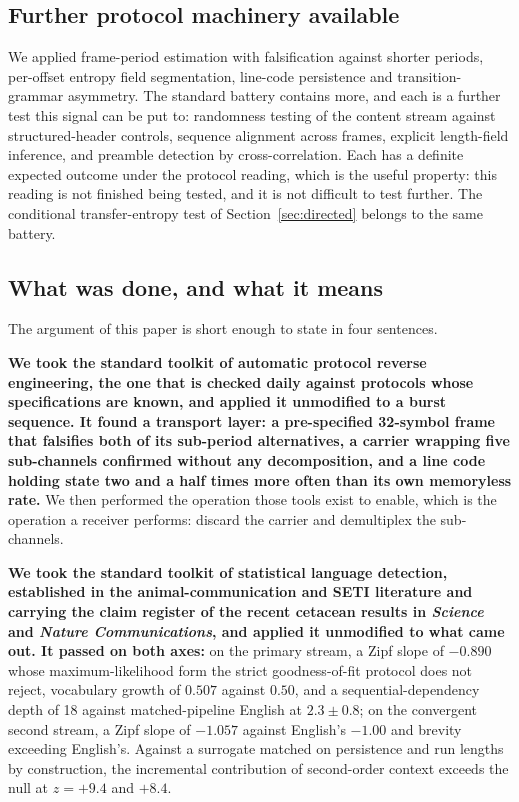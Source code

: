 \documentclass[11pt,a4paper]{article}
\begin{document}
\subsection{Further protocol machinery available}
\label{sec:further}

We applied frame-period estimation with falsification against shorter periods,
per-offset entropy field segmentation, line-code persistence and
transition-grammar asymmetry. The standard battery contains more, and each is a further
test this signal can be put to: randomness testing of the content stream against
structured-header controls, sequence alignment across frames, explicit length-field
inference, and preamble detection by cross-correlation. Each has a definite expected
outcome under the protocol reading, which is the useful property: this reading is not
finished being tested, and it is not difficult to test further. The conditional
transfer-entropy test of Section~\ref{sec:directed} belongs to the same battery.

\subsection{What was done, and what it means}

The argument of this paper is short enough to state in four sentences.

\textbf{We took the standard toolkit of automatic protocol reverse engineering, the one
that is checked daily against protocols whose specifications are known, and applied it
unmodified to a burst sequence. It found a transport layer: a pre-specified 32-symbol
frame that falsifies both of its sub-period alternatives, a carrier wrapping five
sub-channels confirmed without any decomposition, and a line code holding state two
and a half times more often than its own memoryless rate.} We then performed the
operation those tools exist to enable, which is the operation a receiver performs:
discard the carrier and demultiplex the sub-channels.

\textbf{We took the standard toolkit of statistical language detection, established in
the animal-communication and SETI literature and carrying the claim register of the
recent cetacean results in \emph{Science} and \emph{Nature Communications}, and applied
it unmodified to what came out. It passed on both axes:} on the primary stream, a Zipf
slope of $-0.890$ whose maximum-likelihood form the strict goodness-of-fit protocol
does not reject, vocabulary growth of $0.507$ against $0.50$, and a
sequential-dependency depth of 18
against matched-pipeline English at $2.3 \pm 0.8$; on the convergent second stream, a
Zipf slope of $-1.057$ against English's $-1.00$ and brevity exceeding English's. Against a surrogate matched on
persistence and run lengths by construction, the incremental contribution of second-order
context exceeds the null at $z = +9.4$ and $+8.4$.
\end{document}
